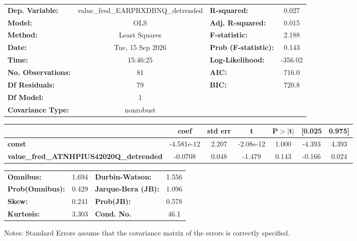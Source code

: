 \begin{center}
\begin{tabular}{lclc}
\toprule
\textbf{Dep. Variable:}                         & value\_fred\_EARPRXDBNQ\_detrended & \textbf{  R-squared:         } &     0.027   \\
\textbf{Model:}                                 &                OLS                 & \textbf{  Adj. R-squared:    } &     0.015   \\
\textbf{Method:}                                &           Least Squares            & \textbf{  F-statistic:       } &     2.188   \\
\textbf{Date:}                                  &          Tue, 15 Sep 2026          & \textbf{  Prob (F-statistic):} &    0.143    \\
\textbf{Time:}                                  &              15:46:25              & \textbf{  Log-Likelihood:    } &   -356.02   \\
\textbf{No. Observations:}                      &                   81               & \textbf{  AIC:               } &     716.0   \\
\textbf{Df Residuals:}                          &                   79               & \textbf{  BIC:               } &     720.8   \\
\textbf{Df Model:}                              &                    1               & \textbf{                     } &             \\
\textbf{Covariance Type:}                       &             nonrobust              & \textbf{                     } &             \\
\bottomrule
\end{tabular}
\begin{tabular}{lcccccc}
                                                & \textbf{coef} & \textbf{std err} & \textbf{t} & \textbf{P$> |$t$|$} & \textbf{[0.025} & \textbf{0.975]}  \\
\midrule
\textbf{const}                                  &   -4.581e-12  &        2.207     & -2.08e-12  &         1.000        &       -4.393    &        4.393     \\
\textbf{value\_fred\_ATNHPIUS42020Q\_detrended} &      -0.0708  &        0.048     &    -1.479  &         0.143        &       -0.166    &        0.024     \\
\bottomrule
\end{tabular}
\begin{tabular}{lclc}
\textbf{Omnibus:}       &  1.694 & \textbf{  Durbin-Watson:     } &    1.556  \\
\textbf{Prob(Omnibus):} &  0.429 & \textbf{  Jarque-Bera (JB):  } &    1.096  \\
\textbf{Skew:}          &  0.241 & \textbf{  Prob(JB):          } &    0.578  \\
\textbf{Kurtosis:}      &  3.303 & \textbf{  Cond. No.          } &     46.1  \\
\bottomrule
\end{tabular}
\end{center}

Notes: \newline
 [1] Standard Errors assume that the covariance matrix of the errors is correctly specified.